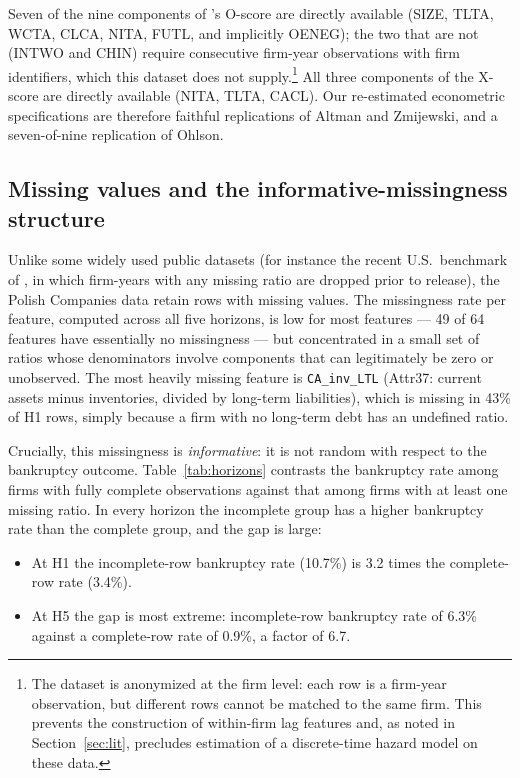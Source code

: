 \documentclass[11pt,a4paper]{article}
\begin{document}
\noindent
Seven of the nine components of \cite{ohlson1980}'s O-score are directly
available (SIZE, TLTA, WCTA, CLCA, NITA, FUTL, and implicitly OENEG); the
two that are not (INTWO and CHIN) require consecutive firm-year observations
with firm identifiers, which this dataset does not supply.\footnote{The
dataset is anonymized at the firm level: each row is a firm-year observation,
but different rows cannot be matched to the same firm. This prevents the
construction of within-firm lag features and, as noted in
Section~\ref{sec:lit}, precludes estimation of a \cite{shumway2001}
discrete-time hazard model on these data.} All three components of the
\cite{zmijewski1984} X-score are directly available (NITA, TLTA, CACL).
Our re-estimated econometric specifications are therefore faithful
replications of Altman and Zmijewski, and a seven-of-nine replication of
Ohlson.

\subsection{Missing values and the informative-missingness structure}
\label{sec:missing}

Unlike some widely used public datasets (for instance the recent U.S.\
benchmark of \citealt{pellegrino2022}, in which firm-years with any missing
ratio are dropped prior to release), the Polish Companies data retain rows
with missing values. The missingness rate per feature, computed across all
five horizons, is low for most features --- 49 of 64 features have
essentially no missingness --- but concentrated in a small set of ratios
whose denominators involve components that can legitimately be zero or
unobserved. The most heavily missing feature is \texttt{CA\_inv\_LTL}
(Attr37: current assets minus inventories, divided by long-term liabilities),
which is missing in 43\% of H1 rows, simply because a firm with no long-term
debt has an undefined ratio.

Crucially, this missingness is \textit{informative}: it is not random with
respect to the bankruptcy outcome. Table~\ref{tab:horizons} contrasts the
bankruptcy rate among firms with fully complete observations against that
among firms with at least one missing ratio. In every horizon the incomplete
group has a higher bankruptcy rate than the complete group, and the gap is
large:

\begin{itemize}
\item At H1 the incomplete-row bankruptcy rate (10.7\%) is 3.2 times the
complete-row rate (3.4\%).
\item At H5 the gap is most extreme: incomplete-row bankruptcy rate of 6.3\%
against a complete-row rate of 0.9\%, a factor of 6.7.
\end{itemize}
\end{document}
